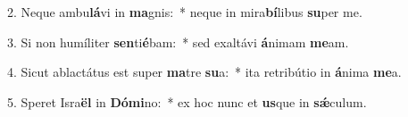 2. Neque ambu\textbf{lá}vi in \textbf{ma}gnis:~*  neque in mira\textbf{bí}libus \textbf{su}per me.\

3. Si non humíliter \textbf{sen}ti\textbf{é}bam:~*  sed exaltávi \textbf{á}nimam \textbf{me}am.\

4. Sicut ablactátus est super \textbf{ma}tre \textbf{su}a:~*  ita retribútio in \textbf{á}nima \textbf{me}a.\

5. Speret Isra\textbf{ël} in \textbf{Dó}\textbf{mi}no:~*  ex hoc nunc et \textbf{us}que in \textbf{sǽ}culum.\

